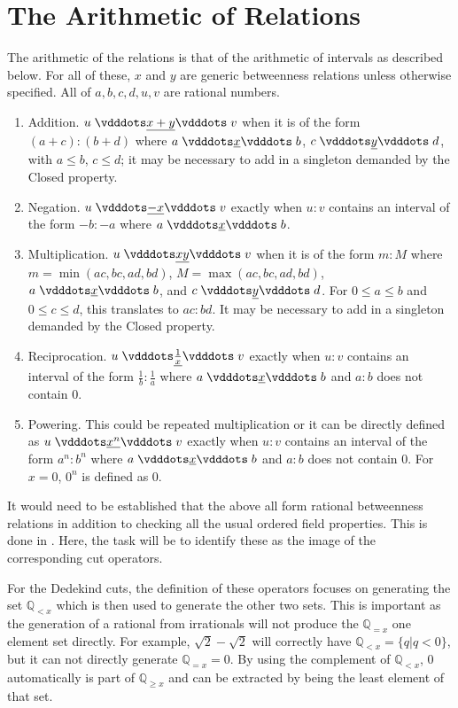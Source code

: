 \documentclass[12pt]{article}
\newcommand{\qcut}[2][x]{\ensuremath{\mathbb{Q}_{#2 #1}}}
\newcommand{\qlt}[1][x]{\qcut[#1]{<}}
\newcommand{\qeq}[1][x]{\qcut[#1]{=}}
\newcommand{\qgeq}[1][x]{\qcut[#1]{\geq}}
\newcommand{\yrel}{\xrel[y]}
\begin{document}
\section{The Arithmetic of Relations}

The arithmetic of the relations is that of the arithmetic of intervals as described below. For all of these, $x$ and $y$ are generic betweenness relations unless otherwise specified. All of $a, b, c, d, u, v$ are rational numbers.
\begin{enumerate}
    \item Addition. $u \xrel[x+y] v$ when it is of the form $(a+c):(b+d)$ where $a \xrel b$, $c \yrel d$, with $a \leq b$, $c \leq d$; it may be necessary to add in a singleton demanded by the Closed property.  
    \item Negation. $u \xrel[-x] v$ exactly when $u:v$ contains an interval of the form $-b:-a$ where $a \xrel b$. 
    \item Multiplication. $u \xrel[xy] v$  when it is of the form $m:M$ where $m = \min(ac, bc, ad, bd)$, $M = \max(ac, bc, ad, bd)$, $a \xrel b$, and $c \yrel d$. For $0 \leq a \leq b$ and $0 \leq c \leq d$, this translates to $ac:bd$. It may be necessary to add in a singleton demanded by the Closed property. 
    \item Reciprocation. $u \xrel[\frac{1}{x}] v$ exactly when $u:v$ contains an interval of the form $\frac{1}{b}:\frac{1}{a}$ where $a \xrel b$ and $a:b$ does not contain 0. 
    \item Powering. This could be repeated multiplication or it can be directly defined as $u \xrel[x^n] v$ exactly when $u:v$ contains an interval of the form $a^n: b^n$ where $a \xrel b$ and $a:b$ does not contain 0. For $x = 0$, $0^n$ is defined as $0$. 
\end{enumerate}

It would need to be established that the above all form rational betweenness relations in addition to checking all the usual ordered field properties. This is done in \cite{taylor23main}. Here, the task will be to identify these as the image of the corresponding cut operators.

For the Dedekind cuts, the definition of these operators focuses on generating the set $\qlt$ which is then used to generate the other two sets. This is important as the generation of a rational from irrationals will not produce the $\qeq$ one element set directly. For example, $ \sqrt{2} - \sqrt{2}$ will correctly have $\qlt = \{ q | q < 0\}$, but it can not directly generate $\qeq = 0$. By using the complement of $\qlt$, 0 automatically is part of $\qgeq$ and can be extracted by being the least element of that set.
\end{document}
